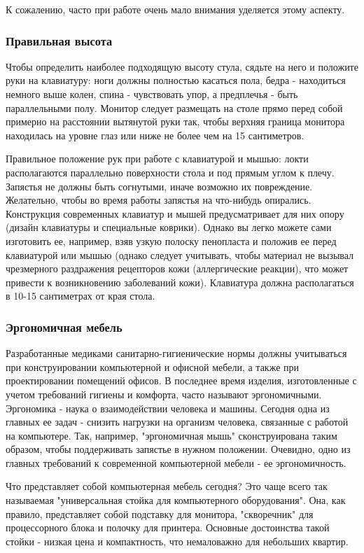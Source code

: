 \documentclass[russian,utf8,emptystyle]{eskdtext}
\begin{document}
\begin{spacing}{1.5}
К сожалению, часто при работе очень мало внимания уделяется этому аспекту.

\subsubsection{Правильная высота}
Чтобы определить наиболее подходящую высоту стула, сядьте на него и положите руки на клавиатуру: ноги должны полностью касаться пола, бедра - находиться немного выше колен, спина - чувствовать упор, а предплечья - быть параллельными полу. Монитор следует размещать на столе прямо перед собой примерно на расстоянии вытянутой руки так, чтобы верхняя граница монитора находилась на уровне глаз или ниже не более чем на 15 сантиметров. 

Правильное положение рук при работе с клавиатурой и мышью: локти располагаются параллельно поверхности стола и под прямым углом к плечу. Запястья не должны быть согнутыми, иначе возможно их повреждение. Желательно, чтобы во время работы запястья на что-нибудь опирались. Конструкция современных клавиатур и мышей предусматривает для них опору (дизайн клавиатуры и специальные коврики). Однако вы легко можете сами изготовить ее, например, взяв узкую полоску пенопласта и положив ее перед клавиатурой или мышью (однако следует учитывать, чтобы материал не вызывал чрезмерного раздражения рецепторов кожи (аллергические реакции), что может привести к возникновению заболеваний кожи). Клавиатура должна располагаться в 10-15 сантиметрах от края стола.

\subsubsection{Эргономичная мебель}
Разработанные медиками санитарно-гигиенические нормы должны учитываться при конструировании компьютерной и офисной мебели, а также при проектировании помещений офисов. В последнее время изделия, изготовленные с учетом требований гигиены и комфорта, часто называют эргономичными. Эргономика - наука о взаимодействии человека и машины. Сегодня одна из главных ее задач - снизить нагрузки на организм человека, связанные с работой на компьютере. Так, например, "эргономичная мышь" сконструирована таким образом, чтобы поддерживать запястье в нужном положении. Очевидно, одно из главных требований к современной компьютерной мебели - ее эргономичность.

Что представляет собой компьютерная мебель сегодня? Это чаще всего так называемая "универсальная стойка для компьютерного оборудования". Она, как правило, представляет собой подставку для монитора, "скворечник" для процессорного блока и полочку для принтера. Основные достоинства такой стойки - низкая цена и компактность, что немаловажно для небольших квартир.


\end{spacing}
\end{document}
